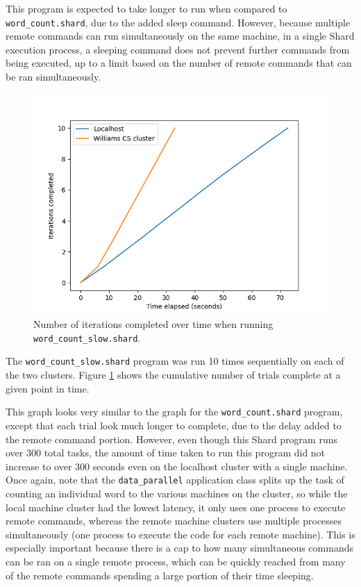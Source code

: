 \documentclass[oneside]{report}
\begin{document}
This program is expected to take longer to run when compared to \texttt{word\_count.shard}, due to the added sleep command.
However, because multiple remote commands can run simultaneously on the same machine, in a single Shard execution process, a sleeping command does not prevent further commands from being executed, up to a limit based on the number of remote commands that can be ran simultaneously.

\begin{figure}[h]
  \begin{center}
    \includegraphics[scale=0.9]{img/experiments/e3_1620960581241.png}
    \caption{Number of iterations completed over time when running \texttt{word\_count\_slow.shard}.}
    \label{fig:wordcountslow}
  \end{center}
\end{figure}

The \texttt{word\_count\_slow.shard} program was run 10 times sequentially on each of the two clusters.
Figure \ref{fig:wordcountslow} shows the cumulative number of trials complete at a given point in time.

This graph looks very similar to the graph for the \texttt{word\_count.shard} program, except that each trial look much longer to complete, due to the delay added to the remote command portion.
However, even though this Shard program runs over 300 total tasks, the amount of time taken to run this program did not increase to over 300 seconds even on the localhost cluster with a single machine.
Once again, note that the \texttt{data\_parallel} application class splits up the task of counting an individual word to the various machines on the cluster, so while the local machine cluster had the lowest latency, it only uses one process to execute remote commands, whereas the remote machine clusters use multiple processes simultaneously (one process to execute the code for each remote machine).
This is especially important because there is a cap to how many simultaneous commands can be ran on a single remote process, which can be quickly reached from many of the remote commands spending a large portion of their time sleeping.
\end{document}
